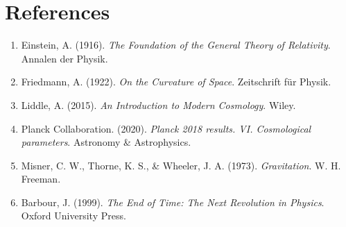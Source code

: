 \documentclass[12pt]{article}
\begin{document}
\section*{References}
\begin{enumerate}
    \item Einstein, A. (1916). \textit{The Foundation of the General Theory of Relativity}. Annalen der Physik.
    \item Friedmann, A. (1922). \textit{On the Curvature of Space}. Zeitschrift für Physik.
    \item Liddle, A. (2015). \textit{An Introduction to Modern Cosmology}. Wiley.
    \item Planck Collaboration. (2020). \textit{Planck 2018 results. VI. Cosmological parameters}. Astronomy \& Astrophysics.
    \item Misner, C. W., Thorne, K. S., \& Wheeler, J. A. (1973). \textit{Gravitation}. W. H. Freeman.
    \item Barbour, J. (1999). \textit{The End of Time: The Next Revolution in Physics}. Oxford University Press.
\end{enumerate}
\end{document}
